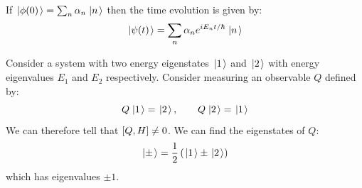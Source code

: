 \documentclass[../Main.tex]{subfiles}
\begin{document}
If $\left.\left|\phi(0)\right.\right\rangle = \sum_n \alpha_n \left.\left|n\right.\right\rangle$ then the time evolution is given by:
\begin{equation*}
    \left.\left|\psi(t)\right.\right\rangle = \sum_n \alpha_n e^{iE_n t / \hbar} \left.\left|n\right.\right\rangle 
\end{equation*}
\begin{example}
    Consider a system with two energy eigenstates $\left.\left|1\right.\right\rangle$ and $\left.\left|2\right.\right\rangle$ with energy eigenvalues $E_1$ and $E_2$ respectively. Consider measuring an observable $Q$ defined by:
    \begin{equation*}
        Q\left.\left|1\right.\right\rangle = \left.\left|2\right.\right\rangle,\qquad Q\left.\left|2\right.\right\rangle = \left.\left|1\right.\right\rangle
    \end{equation*}
    We can therefore tell that $\left[Q, H\right] \neq 0$. We can find the eigenstates of $Q$:
    \begin{equation*}
        \left.\left|\pm\right.\right\rangle = \frac12 \left(\left.\left|1\right.\right\rangle \pm \left.\left|2\right.\right\rangle\right)
    \end{equation*}
    which has eigenvalues $\pm 1$.


\end{example}
\end{document}
